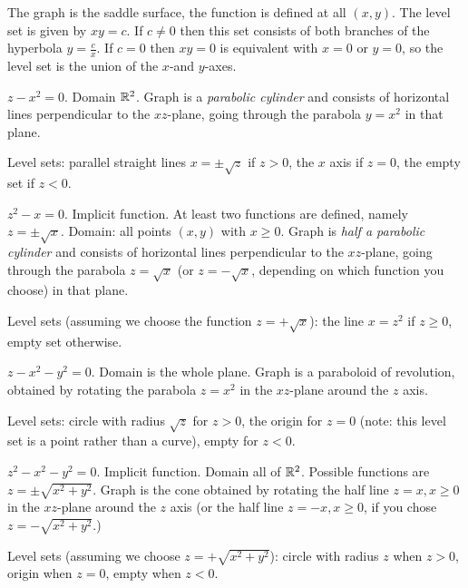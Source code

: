 \item[{\bfseries(III5.7a)}]

The graph is the saddle surface, the function is defined at all $(x,y)$.  The level
set is given by $xy = c$.  If $c\ne 0$ then this set consists of both branches of the
hyperbola $y=\frac{c}{x}$.  If $c=0$ then $xy=0$ is equivalent with $x=0$ or $y=0$,
so the level set is the union of the $x$-and $y$-axes.
\bigskip

\item[{\bfseries(III5.7b)}]

$z-x^2=0$.
Domain $\mathbb{R}^2$.  Graph is a \emph{parabolic cylinder} and consists of
horizontal lines perpendicular to the $xz$-plane, going through the
parabola $y=x^2$ in that plane.

Level sets: parallel straight lines $x=\pm\sqrt{z}$ if $z>0$,
the $x$ axis if $z=0$, the empty set if $z<0$.
\bigskip

\item[{\bfseries(III5.7c)}]

$z^2-x=0$.
Implicit function.
At least two functions are defined, namely $z=\pm \sqrt{x}$.
Domain: all points $(x,y)$ with $x\ge 0$.
Graph is \emph{half a parabolic cylinder} and consists of
horizontal lines perpendicular to the $xz$-plane, going through the
parabola $z=\sqrt x$ (or $z=-\sqrt x$, depending on which function
you choose) in that plane.

Level sets (assuming we choose the function $z=+\sqrt{x}$):
the line $x=z^2$ if $z\ge0$, empty set otherwise.
\bigskip

\item[{\bfseries(III5.7d)}]

$z-x^2-y^2=0$.
Domain is the whole plane.
Graph is a paraboloid of revolution, obtained by rotating the
parabola $z=x^2$ in the $xz$-plane around the $z$ axis.

Level sets: circle with radius $\sqrt{z}$ for $z>0$,
the origin for $z=0$ (note: this level set is a point rather than a curve),
empty for $z<0$.
\bigskip

\item[{\bfseries(III5.7e)}]

$z^2-x^2-y^2=0$.
Implicit function.  Domain all of $\mathbb{R}^2$.
Possible functions are $z=\pm\sqrt{x^2+y^2}$.
Graph is the cone obtained by rotating the
half line $z=x, x\geq0$ in the $xz$-plane around the $z$ axis
(or the half line $z=-x, x\geq0$, if you chose $z=-\sqrt{x^2+y^2}$.)

Level sets (assuming we choose $z=+\sqrt{x^2+y^2}$):  circle with radius
$z$ when $z>0$, origin when $z=0$, empty when $z<0$.
\bigskip

